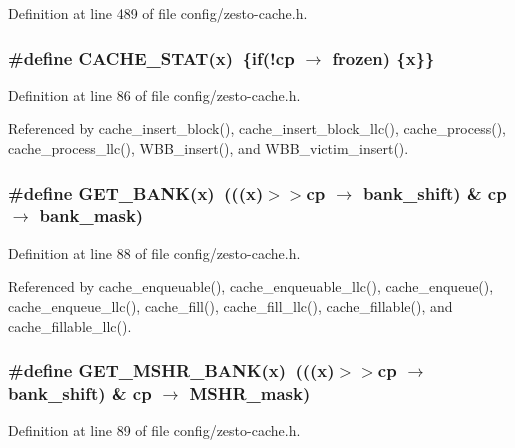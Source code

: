 Definition at line 489 of file config/zesto-cache.h.
\subsubsection[{CACHE\_\-STAT}]{\setlength{\rightskip}{0pt plus 5cm}\#define CACHE\_\-STAT(x)~\{if(!cp $\rightarrow$ frozen) \{x\}\}}\label{config_2zesto-cache_8h_0b5d48674769c2e561375e0710d91169}




Definition at line 86 of file config/zesto-cache.h.

Referenced by cache\_\-insert\_\-block(), cache\_\-insert\_\-block\_\-llc(), cache\_\-process(), cache\_\-process\_\-llc(), WBB\_\-insert(), and WBB\_\-victim\_\-insert().
\subsubsection[{GET\_\-BANK}]{\setlength{\rightskip}{0pt plus 5cm}\#define GET\_\-BANK(x)~(((x)$>$$>$cp $\rightarrow$ bank\_\-shift) \& cp $\rightarrow$ bank\_\-mask)}\label{config_2zesto-cache_8h_1567854259cffa374f9ef7ba763e2586}




Definition at line 88 of file config/zesto-cache.h.

Referenced by cache\_\-enqueuable(), cache\_\-enqueuable\_\-llc(), cache\_\-enqueue(), cache\_\-enqueue\_\-llc(), cache\_\-fill(), cache\_\-fill\_\-llc(), cache\_\-fillable(), and cache\_\-fillable\_\-llc().
\subsubsection[{GET\_\-MSHR\_\-BANK}]{\setlength{\rightskip}{0pt plus 5cm}\#define GET\_\-MSHR\_\-BANK(x)~(((x)$>$$>$cp $\rightarrow$ bank\_\-shift) \& cp $\rightarrow$ MSHR\_\-mask)}\label{config_2zesto-cache_8h_088d13f1f3edc2a38285413565b6a11e}




Definition at line 89 of file config/zesto-cache.h.

